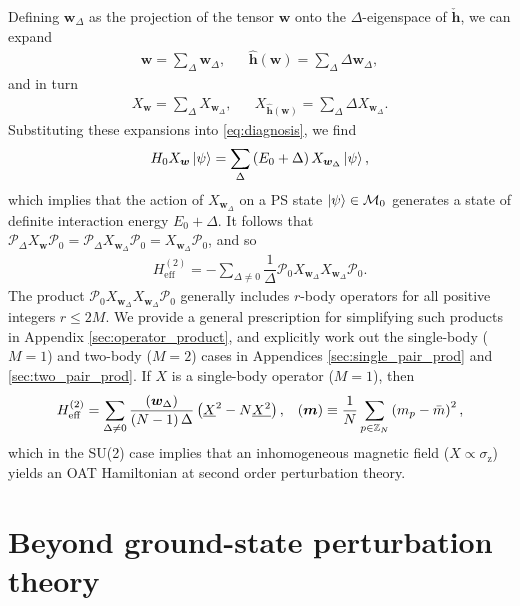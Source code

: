 \documentclass[nofootinbib,notitlepage,11pt]{revtex4-2}
\renewcommand{\t}{\text} %
\newcommand{\f}[2]{\dfrac{#1}{#2}} %
\newcommand{\p}[1]{\left(#1\right)} %
\newcommand{\m}{\bm} %
\newcommand{\1}{\mathds{1}}
\newcommand{\z}{\text{z}}
\newcommand{\M}{\mathcal{M}}
\renewcommand{\P}{\mathcal{P}}
\newcommand{\ZZ}{\mathbb{Z}}
\newcommand{\col}{\underline}
\let\var\relax
\DeclareMathOperator{\var}{var}
\begin{document}
Defining $\m w_\Delta$ as the projection of the tensor $\m w$ onto the
$\Delta$-eigenspace of $\check{\m h}$, we can expand
\begin{align}
  \m w = \sum_\Delta \m w_\Delta,
  &&
  \hat{\m h}\p{\m w} = \sum_\Delta \Delta \m w_\Delta,
\end{align}
and in turn
\begin{align}
  X_{\m w} = \sum_\Delta X_{\m w_\Delta},
  &&
  X_{\hat{\m h}\p{\m w}} = \sum_\Delta \Delta X_{\m w_\Delta}.
\end{align}
Substituting these expansions into \eqref{eq:diagnosis}, we find
\begin{align}
  H_0 X_{\m w} \ket\psi
  = \sum_\Delta\p{E_0 + \Delta} X_{\m w_\Delta} \ket\psi,
\end{align}
which implies that the action of $X_{\m w_\Delta}$ on a PS state
$\ket\psi\in\M_0$ generates a state of definite interaction energy
$E_0+\Delta$.  It follows that
$\P_\Delta X_{\m w} \P_0 = \P_\Delta X_{\m w_\Delta} \P_0 = X_{\m
  w_\Delta} \P_0$, and so
\begin{align}
  H_{\t{eff}}^{(2)} = -\sum_{\Delta\ne0}
  \f1\Delta \P_0 X_{\m w_\Delta} X_{\m w_\Delta} \P_0.
\end{align}
The product $\P_0 X_{\m w_\Delta} X_{\m w_\Delta} \P_0$ generally
includes $r$-body operators for all positive integers $r\le2M$.  We
provide a general prescription for simplifying such products in
Appendix \ref{sec:operator_product}, and explicitly work out the
single-body ($M=1$) and two-body ($M=2$) cases in Appendices
\ref{sec:single_pair_prod} and \ref{sec:two_pair_prod}.  If $X$ is a
single-body operator ($M=1$), then
\begin{align}
  H_{\t{eff}}^{(2)}
  = \sum_{\Delta\ne0} \f{\var\p{\m w_\Delta}}{\p{N-1}\Delta}
  \p{\col{X}^2 - N \col{X^2}},
  &&
  \var\p{\m m} \equiv \f1N \sum_{p\in\ZZ_N} \p{m_p-\bar m}^2,
\end{align}
which in the SU(2) case implies that an inhomogeneous magnetic field
($X\propto\sigma_\z$) yields an OAT Hamiltonian at second order
perturbation theory.

\section{Beyond ground-state perturbation theory}
\label{eq:excited_states}
\end{document}
